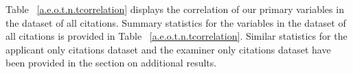 \documentclass[12pt,letterpaper]{article}
\begin{document}


Table ~\ref{a.e.o.t.n.tcorrelation} displays the correlation of our primary variables in the dataset of  all citations. Summary statistics for the variables in the dataset of all citations is provided in Table ~\ref{a.e.o.t.n.tcorrelation}. Similar statistics for the applicant only citations dataset and the examiner only citations dataset have been provided in the section on additional results.


%


%
%



\end{document}
